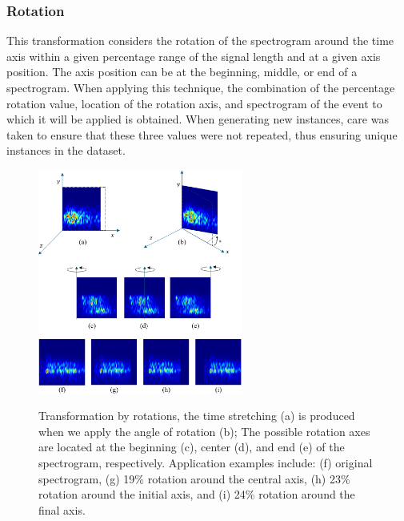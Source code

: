 \documentclass[journal]{IEEEtran}
\begin{document}
\subsubsection{Rotation}
This transformation considers the rotation of the spectrogram around the time axis within a given percentage range of the signal length and at a given axis position. The axis position can be at the beginning, middle, or end of a spectrogram.
When applying this technique, the combination of the percentage rotation value, location of the rotation axis, and spectrogram of the event to which it will be applied is obtained. When generating new instances, care was taken to ensure that these three values were not repeated, thus ensuring unique instances in the dataset.
\begin{figure}
\centering
{\includegraphics[width=0.6\textwidth,keepaspectratio]{img/da_rotacion.png}}
\caption{Transformation by rotations, the time stretching (a) is produced when we apply the angle of rotation (b); The possible rotation axes are located at the beginning (c), center (d), and end (e) of the spectrogram, respectively. Application examples include: (f) original spectrogram, (g) 19\% rotation around the central axis, (h) 23\% rotation around the initial axis, and (i) 24\% rotation around the final axis.}
\label{fig:da_rotation}
\end{figure}
\end{document}
